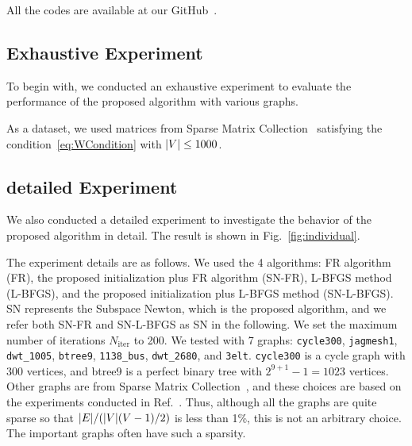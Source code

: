 \documentclass[dvipdfmx,journal]{IEEEtran}
\begin{document}
All the codes are available at our GitHub~\cite{ThisPaperGitHub}.

\subsection{Exhaustive Experiment}\label{ssec:exprAll}

To begin with, we conducted an exhaustive experiment to evaluate the performance of the proposed algorithm with various graphs.

As a dataset, we used matrices from Sparse Matrix Collection~\cite{davis2011university} satisfying the condition~\eqref{eq:WCondition} with $\abs{V} \leq 1000$.

\subsection{detailed Experiment}\label{ssec:exprDetail}

We also conducted a detailed experiment to investigate the behavior of the proposed algorithm in detail. The result is shown in Fig.~\ref{fig:individual}.

The experiment details are as follows.
We used the 4 algorithms: FR algorithm (\textsf{FR}), the proposed initialization plus FR algorithm (\textsf{SN-FR}), L-BFGS method (\textsf{L-BFGS}), and the proposed initialization plus L-BFGS method (\textsf{SN-L-BFGS}). \textsf{SN} represents the Subspace Newton, which is the proposed algorithm, and we refer both \textsf{SN-FR} and \textsf{SN-L-BFGS} as \textsf{SN} in the following. We set the maximum number of iterations $N_\mathrm{iter}$ to 200.
We tested with 7 graphs: \texttt{cycle300}, \texttt{jagmesh1}, \texttt{dwt\_1005}, \texttt{btree9}, \texttt{1138\_bus}, \texttt{dwt\_2680}, and \texttt{3elt}. \texttt{cycle300} is a cycle graph with 300 vertices, and btree9 is a perfect binary tree with $2^{9+1}-1=1023$ vertices. Other graphs are from Sparse Matrix Collection~\cite{davis2011university}, and these choices are based on the experiments conducted in Ref.~\cite{8419285}. Thus, although all the graphs are quite sparse so that $\abs{E} / (\abs{V}(V-1)/2)$ is less than 1\%, this is not an arbitrary choice. The important graphs often have such a sparsity.
\end{document}
